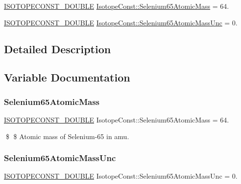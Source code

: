 \begin{DoxyCompactItemize}
\item 
\mbox{\hyperlink{group___isotope_const-_macros_ga8f45a7272ce02c0b4c65c44636ed719a}{I\+S\+O\+T\+O\+P\+E\+C\+O\+N\+S\+T\+\_\+\+D\+O\+U\+B\+LE}} \mbox{\hyperlink{group___isotope_const-_selenium-_se65_gaffd82ec4146705910c5afd5a63b0f22f}{Isotope\+Const\+::\+Selenium65\+Atomic\+Mass}} = 64.
\item 
\mbox{\hyperlink{group___isotope_const-_macros_ga8f45a7272ce02c0b4c65c44636ed719a}{I\+S\+O\+T\+O\+P\+E\+C\+O\+N\+S\+T\+\_\+\+D\+O\+U\+B\+LE}} \mbox{\hyperlink{group___isotope_const-_selenium-_se65_ga5795b619e4f89f4d245b6838dde774ab}{Isotope\+Const\+::\+Selenium65\+Atomic\+Mass\+Unc}} = 0.
\end{DoxyCompactItemize}


\subsection{Detailed Description}


\subsection{Variable Documentation}
\mbox{\label{group___isotope_const-_selenium-_se65_gaffd82ec4146705910c5afd5a63b0f22f}} 
\subsubsection{\texorpdfstring{Selenium65\+Atomic\+Mass}{Selenium65AtomicMass}}
{\footnotesize\ttfamily \mbox{\hyperlink{group___isotope_const-_macros_ga8f45a7272ce02c0b4c65c44636ed719a}{I\+S\+O\+T\+O\+P\+E\+C\+O\+N\+S\+T\+\_\+\+D\+O\+U\+B\+LE}} Isotope\+Const\+::\+Selenium65\+Atomic\+Mass = 64.}

\$ \$ Atomic mass of Selenium-\/65 in amu. \mbox{\label{group___isotope_const-_selenium-_se65_ga5795b619e4f89f4d245b6838dde774ab}} 
\subsubsection{\texorpdfstring{Selenium65\+Atomic\+Mass\+Unc}{Selenium65AtomicMassUnc}}
{\footnotesize\ttfamily \mbox{\hyperlink{group___isotope_const-_macros_ga8f45a7272ce02c0b4c65c44636ed719a}{I\+S\+O\+T\+O\+P\+E\+C\+O\+N\+S\+T\+\_\+\+D\+O\+U\+B\+LE}} Isotope\+Const\+::\+Selenium65\+Atomic\+Mass\+Unc = 0.}

